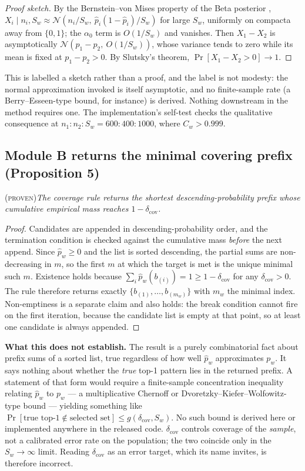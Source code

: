 \documentclass[final,5p,times,longtitle]{elsarticle}
\theoremstyle{plain}
\newcommand{\PROVEN}{\textsc{(proven)}}
\newcommand{\Cw}{C_w}
\newcommand{\dcov}{\delta_{\mathrm{cov}}}
\begin{document}
\begin{proof}[Proof sketch]
By the Bernstein--von Mises property of the Beta posterior
\cite[Ch.~10]{vandervaart1998},
$X_i\mid n_i,S_w\approx\mathcal{N}(n_i/S_w,\ \hat p_i(1-\hat p_i)/S_w)$
for large $S_w$, uniformly on compacta away from $\{0,1\}$; the
$\alpha_0$ term is $O(1/S_w)$ and vanishes. Then $X_1-X_2$ is
asymptotically $\mathcal{N}(p_1-p_2,\ O(1/S_w))$, whose variance tends to
zero while its mean is fixed at $p_1-p_2>0$. By Slutsky's theorem,
$\Pr[X_1-X_2>0]\to1$.
\end{proof}

\noindent
This is labelled a sketch rather than a proof, and the label is not
modesty: the normal approximation invoked is itself asymptotic, and no
finite-sample rate (a Berry--Esseen-type bound, for instance) is derived.
Nothing downstream in the method requires one. The implementation's
self-test checks the qualitative consequence at
$n_1{:}n_2{:}S_w=600{:}400{:}1000$, where $\Cw>0.999$.

\subsection{Module B returns the minimal covering prefix (Proposition 5)}
\PROVEN{}\quad\textit{The coverage rule returns the shortest
descending-probability prefix whose cumulative empirical mass reaches
$1-\dcov$.}

\begin{proof}
Candidates are appended in descending-probability order, and the
termination condition is checked against the cumulative mass \emph{before}
the next append. Since $\hat p_w\ge0$ and the list is sorted descending,
the partial sums are non-decreasing in $m$, so the first $m$ at which the
target is met is the unique minimal such $m$. Existence holds because
$\sum_i\hat p_w(b_{(i)})=1\ge1-\dcov$ for any $\dcov>0$. The rule
therefore returns exactly $\{b_{(1)},\dots,b_{(m_w)}\}$ with $m_w$ the
minimal index. Non-emptiness is a separate claim and also holds: the
break condition cannot fire on the first iteration, because the candidate
list is empty at that point, so at least one candidate is always
appended.
\end{proof}

\noindent
\textbf{What this does not establish.} The result is a purely
combinatorial fact about prefix sums of a sorted list, true regardless of
how well $\hat p_w$ approximates $p_w$. It says nothing about whether the
\emph{true} top-1 pattern lies in the returned prefix. A statement of
that form would require a finite-sample concentration inequality relating
$\hat p_w$ to $p_w$ --- a multiplicative Chernoff or
Dvoretzky--Kiefer--Wolfowitz-type bound --- yielding something like
$\Pr[\text{true top-1}\notin\text{selected set}]\le g(\dcov,S_w)$. No
such bound is derived here or implemented anywhere in the released code.
$\dcov$ controls coverage of the \emph{sample}, not a calibrated error
rate on the population; the two coincide only in the $S_w\to\infty$
limit. Reading $\dcov$ as an error target, which its name invites, is
therefore incorrect.
\end{document}

